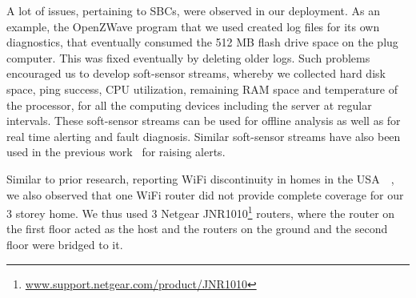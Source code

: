 \documentclass[10pt]{sensys-proc}
\newcommand{\figref}[1]{Figure~\ref{#1}}
\newcommand{\secref}[1]{Section~\ref{#1}}
\newcommand{\paradigm}{Sense-Local Store-Upload}
\begin{document}





A lot of issues, pertaining to SBCs, were observed in our deployment. As an example, the OpenZWave program that we used created log files for its own diagnostics, that eventually consumed the 512 MB flash drive space on the plug computer. This was fixed eventually by deleting older logs. Such problems encouraged us to develop soft-sensor streams, whereby we collected hard disk space, ping success, CPU utilization, remaining RAM space and temperature of the processor, for all the computing devices including the server at regular intervals. These soft-sensor streams can be used for offline analysis as well as for real time alerting and fault diagnosis. Similar soft-sensor streams have also been used in the previous work~\cite{hitchhiker_residential} for raising alerts.

Similar to prior research, reporting WiFi discontinuity in homes in the USA~~\cite{hitchhiker_residential}, we also observed that one WiFi router did not provide complete coverage for our 3 storey home. We thus used 3 Netgear JNR1010\footnote{\url{www.support.netgear.com/product/JNR1010}} routers, where the router on the first floor acted as the host and the routers on the ground and the second floor were bridged to it. %
\end{document}
